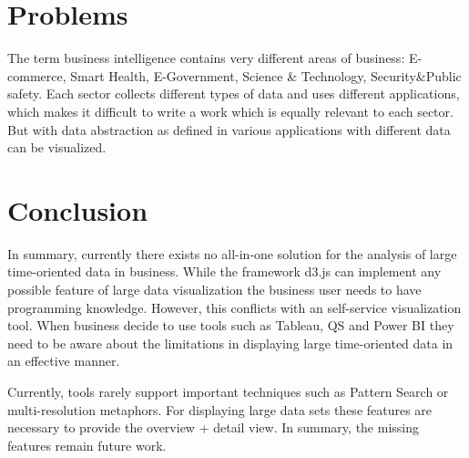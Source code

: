 \section{Problems}
The term business intelligence contains very different areas of business: E-commerce, Smart Health, E-Government, Science & Technology, Security&Public safety. Each sector collects different types of data and uses different applications, which makes it difficult to write a work which is equally relevant to each sector. \cite{ChenH.ChiangR.Sorey2012}
But with data abstraction as defined in \cite{Aigner2007} various applications with different data can be visualized.

\section{Conclusion}\label{conclusion}
In summary, currently there exists no all-in-one solution for the analysis of large time-oriented data in business. While the framework d3.js can implement any possible feature of large data visualization the business user needs to have programming knowledge. However, this conflicts with an self-service visualization tool. When business decide to use tools such as Tableau, QS and Power BI they need to be aware about the limitations in displaying large time-oriented  data in an effective manner. 
\par
Currently, tools rarely support important techniques such as Pattern Search or multi-resolution metaphors. For displaying large data sets these features are necessary to provide the overview + detail view. In summary, the missing features remain future work.
